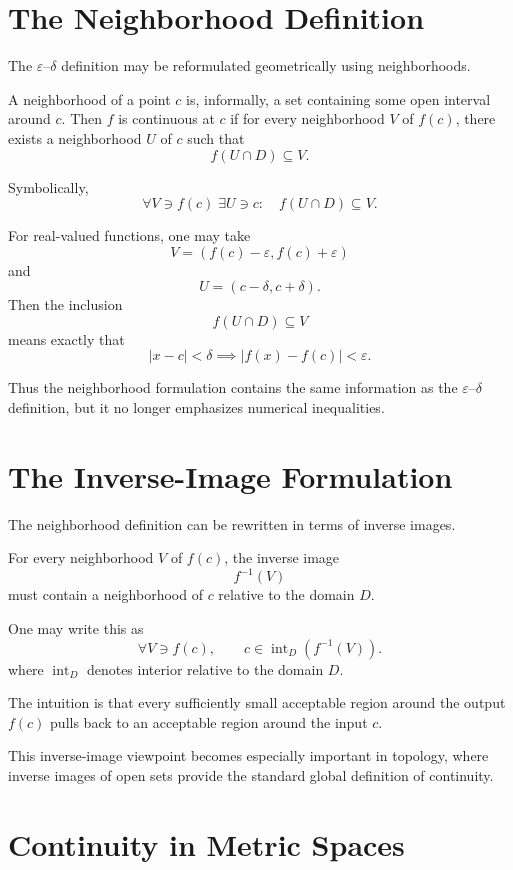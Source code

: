 \documentclass{essay}
\begin{document}
\section{The Neighborhood Definition}

The \(\varepsilon\)--\(\delta\) definition may be reformulated geometrically using neighborhoods.

A neighborhood of a point \(c\) is, informally, a set containing some open interval around \(c\). Then \(f\) is continuous at \(c\) if for every neighborhood \(V\) of \(f(c)\), there exists a neighborhood \(U\) of \(c\) such that
\[ f(U\cap D)\subseteq V. \]

Symbolically,
\[ \boxed{ \forall V\ni f(c)\;\exists U\ni c: \quad f(U\cap D)\subseteq V. } \]

For real-valued functions, one may take
\[ V=(f(c)-\varepsilon,f(c)+\varepsilon) \]
and
\[ U=(c-\delta,c+\delta). \]
Then the inclusion
\[ f(U\cap D)\subseteq V \]
means exactly that
\[ |x-c|<\delta \implies |f(x)-f(c)|<\varepsilon. \]

Thus the neighborhood formulation contains the same information as the \(\varepsilon\)--\(\delta\) definition, but it no longer emphasizes numerical inequalities.

\section{The Inverse-Image Formulation}

The neighborhood definition can be rewritten in terms of inverse images.

For every neighborhood \(V\) of \(f(c)\), the inverse image
\[ f^{-1}(V) \]
must contain a neighborhood of \(c\) relative to the domain \(D\).

One may write this as
\[ \boxed{ \forall V\ni f(c), \qquad c\in \operatorname{int}_{D}(f^{-1}(V)). } \]
where \(\operatorname{int}_{D}\) denotes interior relative to the domain \(D\).

The intuition is that every sufficiently small acceptable region around the output \(f(c)\) pulls back to an acceptable region around the input \(c\).

This inverse-image viewpoint becomes especially important in topology, where inverse images of open sets provide the standard global definition of continuity.

\section{Continuity in Metric Spaces}
\end{document}
